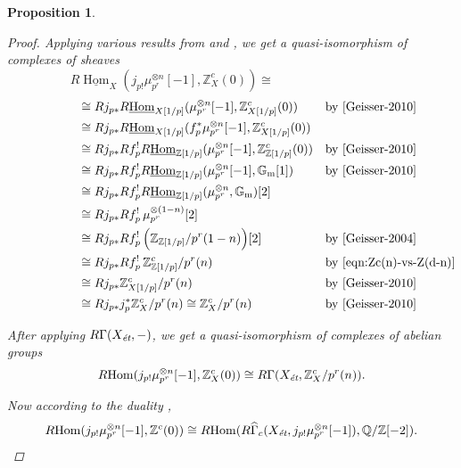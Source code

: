 \documentclass[leqno,12pt]{article}
\theoremstyle{plain}
\newtheorem{proposition}[theorem]{\indent\sc Proposition}
\theoremstyle{definition}
\DeclareMathOperator{\Hom}{Hom}
\newcommand{\QQ}{\mathbb{Q}}
\newcommand{\ZZ}{\mathbb{Z}}
\newcommand{\et}{\text{\it \'{e}t}}
\newcommand{\iHom}{\underline{\Hom}}
\newcommand{\RHom}{R\!\Hom}
\begin{document}
\begin{proposition}
\begin{proof}
    Applying various results from \cite{Geisser-2004} and \cite{Geisser-2010},
    we get a quasi-isomorphism of complexes of sheaves
    \[ R\iHom_X (j_{p!} \mu_{p^r}^{\otimes n} [-1], \ZZ^c_X (0)) \cong \hspace{4cm} \]
    \begin{align*}
      \hspace{2cm} & \cong R j_{p*} R\iHom_{X [1/p]} (\mu_{p^r}^{\otimes n} [-1], \ZZ^c_{X [1/p]} (0)) && \text{by \cite[Prop. 7.10~(c)]{Geisser-2010}} \\
      & \cong R j_{p*} R\iHom_{X[1/p]} (f_p^* \mu_{p^r}^{\otimes n} [-1], \ZZ^c_{X [1/p]} (0)) \\
      & \cong R j_{p*} R f^!_p R\iHom_{\ZZ [1/p]} (\mu_{p^r}^{\otimes n} [-1], \ZZ^c_{\ZZ [1/p]} (0)) && \text{by \cite[Prop. 7.10~(c)]{Geisser-2010}} \\
                                                                & \cong R j_{p*} R f^!_p R\iHom_{\ZZ [1/p]} (\mu_{p^r}^{\otimes n} [-1], \mathbb{G}_\mathrm{m} [1]) && \text{by \cite[Lemma~7.4]{Geisser-2010}} \\
      & \cong R j_{p*} R f^!_p R\iHom_{\ZZ [1/p]} (\mu_{p^r}^{\otimes n}, \mathbb{G}_\mathrm{m}) [2] \\
                                                                & \cong R j_{p*} R f^!_p \, \mu_{p^r}^{\otimes (1-n)} [2] \\
      & \cong R j_{p*} R f^!_p \, \Bigl(\ZZ_{\ZZ [1/p]}/p^r (1-n)\Bigr) [2] && \text{by \cite[Thm.~1.2]{Geisser-2004}} \\
                                                                & \cong R j_{p*} R f^!_p \, \ZZ^c_{\ZZ [1/p]}/p^r (n) && \text{by \eqref{eqn:Zc(n)-vs-Z(d-n)}} \\
                                                                & \cong R j_{p*} \ZZ^c_{X [1/p]} / p^r (n) && \text{by \cite[Prop.~7.10~(a)]{Geisser-2010}} \\
                                                                & \cong R j_{p*} j_p^*\ZZ^c_X/p^r (n) \cong \ZZ^c_X/p^r (n) && \text{by \cite[Thm.~7.2~(a), Prop.~2.3]{Geisser-2010}}
    \end{align*}


    After applying $R\Gamma (X_\et, -)$, we get a quasi-isomorphism of
    complexes of abelian groups
    \[
      \RHom (j_{p!} \mu_{p^r}^{\otimes n} [-1], \ZZ^c_X (0)) \cong
      R\Gamma (X_\et, \ZZ^c_X/p^r (n)).
    \]

    Now according to the duality \cite[Theorem~7.8]{Geisser-2010},
    \[
      \RHom (j_{p !} \mu_{p^r}^{\otimes n} [-1], \ZZ^c (0)) \cong
      \RHom (R\widehat{\Gamma}_c (X_\et, j_{p !} \mu_{p^r}^{\otimes n} [-1]), \QQ/\ZZ [-2]).
    \]


\end{proof}
\end{proposition}
\end{document}
